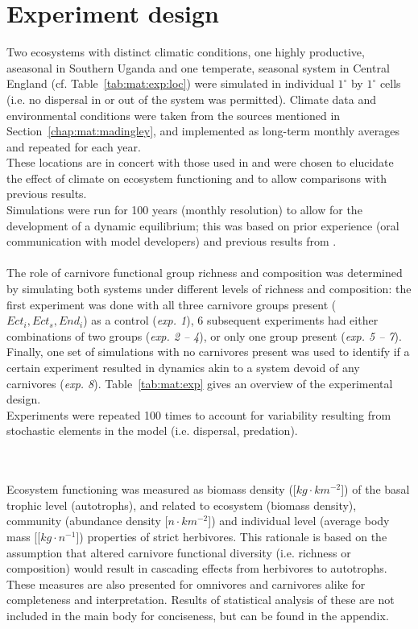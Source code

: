 \section{Experiment design}
\label{chap:mat:exp}
Two ecosystems with distinct climatic conditions, one highly productive, aseasonal in Southern Uganda and one temperate, seasonal system in Central England (cf. Table~\ref{tab:mat:exp:loc}) were simulated in individual $1^\circ$ by $1^\circ$ cells (i.e. no dispersal in or out of the system was permitted). 
Climate data and environmental conditions were taken from the sources mentioned in Section~\ref{chap:mat:madingley}, and implemented as long-term monthly averages and repeated for each year.\\

These locations are in concert with those used in \citet{Harfoot2014} and were chosen to elucidate the effect of climate on ecosystem functioning and to allow comparisons with previous results. 
\\
Simulations were run for 100 years (monthly resolution) to allow for the development of a dynamic equilibrium; 
this was based on prior experience (oral communication with model developers) and previous results from \cite{Harfoot2014}.
\\\\
The role of carnivore functional group richness and composition was determined by simulating both systems under different levels of richness and composition: 
the first experiment was done with all three carnivore groups present ($Ect_i, Ect_s, End_i$) as a control (\textit{exp. 1}), 6 subsequent experiments had either combinations of two groups (\textit{exp. 2 -- 4}), or only one group present (\textit{exp. 5 -- 7}). 
Finally, one set of simulations with no carnivores present was used to identify if a certain experiment resulted in dynamics akin to a system devoid of any carnivores (\textit{exp. 8}). Table~\ref{tab:mat:exp} gives an overview of the experimental design. \\
Experiments were repeated 100 times to account for variability resulting from stochastic elements in the model (i.e. dispersal, predation).

\\\\
Ecosystem functioning was measured as biomass density ([$kg\cdot km^{-2}$]) of the basal trophic level (autotrophs), and related to ecosystem (biomass density), community (abundance density [$n\cdot km^{-2}$]) and individual level (average body mass [[$kg\cdot n^{-1}$]) properties of strict herbivores. This rationale is based on the assumption that altered carnivore functional diversity (i.e. richness or composition) would result in cascading effects from herbivores to autotrophs. These measures are also presented for omnivores and carnivores alike for completeness and interpretation. Results of statistical analysis of these are not included in the main body for conciseness, but can be found in the appendix.
%
